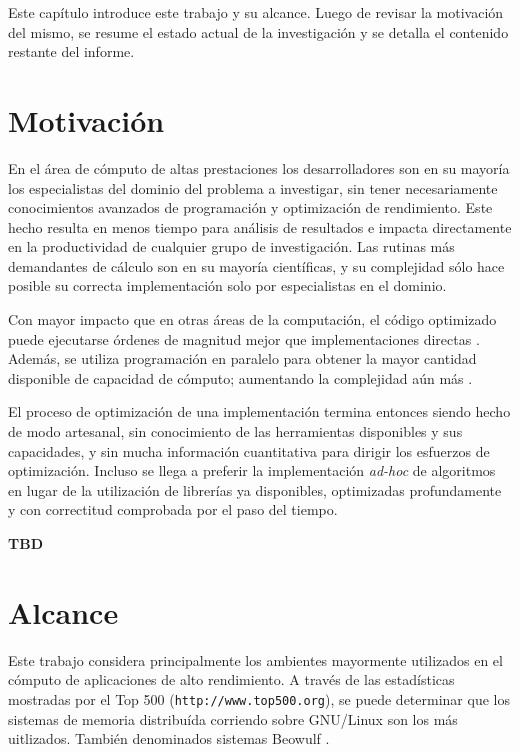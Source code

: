 \documentclass[a4paper]{report}
\begin{document}
Este cap\'itulo introduce este trabajo y su alcance. Luego de revisar la
motivaci\'on del mismo, se resume el estado actual de la investigaci\'on y se
detalla el contenido restante del informe.

\section{Motivaci\'on}

En el \'area de c\'omputo de altas prestaciones los desarrolladores son en su
mayor\'ia los especialistas del dominio del problema a investigar, sin tener
necesariamente conocimientos avanzados de programaci\'on y optimizaci\'on de
rendimiento. Este hecho resulta en menos tiempo para an\'alisis de resultados
e impacta directamente en la productividad de cualquier grupo de
investigaci\'on. Las rutinas m\'as demandantes de c\'alculo son en su
mayor\'ia cient\'ificas, y su complejidad s\'olo hace posible su correcta
implementaci\'on solo por especialistas en el dominio.

\bigskip

Con mayor impacto que en otras \'areas de la computaci\'on, el c\'odigo
optimizado puede ejecutarse \'ordenes de magnitud mejor que implementaciones
directas \cite{mm-matrixmultiplicationtool}. Adem\'as, se utiliza
programaci\'on en paralelo para obtener la mayor cantidad disponible de
capacidad de c\'omputo; aumentando la complejidad a\'un m\'as
\cite{parallel-programming}.

\bigskip

El proceso de optimizaci\'on de una implementaci\'on termina entonces siendo
hecho de modo artesanal, sin conocimiento de las herramientas disponibles y
sus capacidades, y sin mucha informaci\'on cuantitativa para dirigir los
esfuerzos de optimizaci\'on. Incluso se llega a preferir la implementaci\'on
{\em ad-hoc} de algoritmos en lugar de la utilizaci\'on de librer\'ias ya
disponibles, optimizadas profundamente y con correctitud comprobada por el
paso del tiempo.

\bigskip

{\bf TBD}

\section{Alcance}

Este trabajo considera principalmente los ambientes mayormente utilizados en
el c\'omputo de aplicaciones de alto rendimiento. A trav\'es de las
estad\'isticas mostradas por el Top 500 ({\tt http://www.top500.org}), se
puede determinar que los sistemas de memoria distribu\'ida corriendo sobre
GNU/Linux son los m\'as uitlizados. Tambi\'en denominados sistemas Beowulf
\cite{beowulf}.
\end{document}
